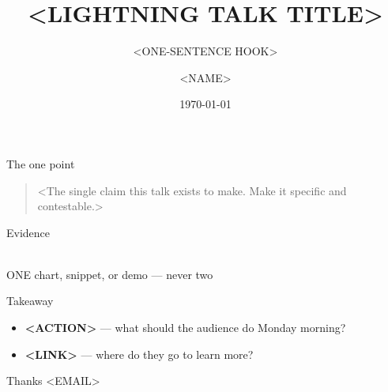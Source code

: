 \documentclass[aspectratio=169,12pt]{beamer}
\title{<LIGHTNING TALK TITLE>}
\subtitle{<ONE-SENTENCE HOOK>}
\author{<NAME>}
\institute{<ORG>}
\date{\today}
\begin{document}
\begin{frame}[plain]
  \titlepage
\end{frame}

\begin{frame}{The one point}
  \vfill
  \begin{quote}
    \Large <The single claim this talk exists to make. Make it specific and contestable.>
  \end{quote}
  \vfill
\end{frame}

\begin{frame}{Evidence}
  \begin{center}
    \fbox{\rule{0pt}{5cm}\rule{0.85\textwidth}{0pt}}\\
    \footnotesize ONE chart, snippet, or demo --- never two
  \end{center}
\end{frame}

\begin{frame}{Takeaway}
  \begin{itemize}
    \item \textbf{<ACTION>} --- what should the audience do Monday morning?
    \item \textbf{<LINK>} --- where do they go to learn more?
  \end{itemize}
\end{frame}

\begin{frame}[plain]{Thanks}
  \vfill
  \centering
  \Large <EMAIL>
  \vfill
\end{frame}
\end{document}
